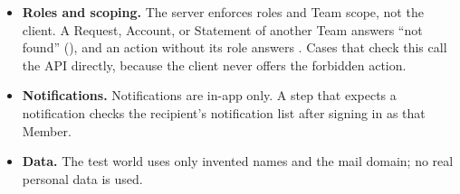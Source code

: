 \begin{itemize}
  \item \textbf{Roles and scoping.} The server enforces roles and Team scope, not the client. A Request, Account, or Statement of another Team answers ``not found'' (), and an action without its role answers . Cases that check this call the API directly, because the client never offers the forbidden action.
  \item \textbf{Notifications.} Notifications are in-app only. A step that expects a notification checks the recipient's notification list after signing in as that Member.
  \item \textbf{Data.} The test world uses only invented names and the  mail domain; no real personal data is used.
\end{itemize}
